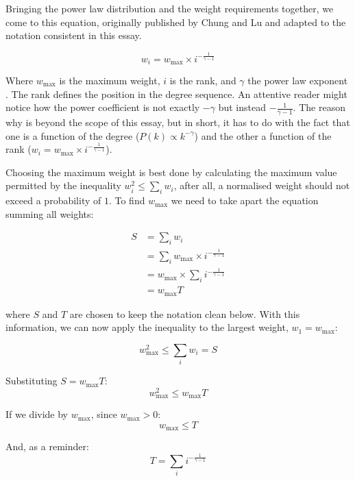 \documentclass[12pt, a4paper]{article}   %
\begin{document}
Bringing the power law distribution and the weight requirements together, we come to this equation, originally published by Chung and Lu and adapted to the notation consistent in this essay. 

\begin{equation} \label{eq:weight-generation-equation}
    w_i = w_{\text{max}} \times i^{ -\frac{1}{\gamma-1}}
\end{equation}

Where \( w_{\text{max}} \) is the maximum weight, \( i \) is the rank, and \( \gamma \) the power law exponent \autocite{chungAverageDistancesRandom2002}. The rank defines the position in the degree sequence. An attentive reader might notice how the power coefficient is not exactly \(-\gamma\) but instead \(-\frac{1}{\gamma-1}\). The reason why is beyond the scope of this essay, but in short, it has to do with the fact that one is a function of the degree (\(P(k) \propto k^{-\gamma}\)) and the other a function of the rank (\( w_i = w_{\text{max}} \times i^{ -\frac{1}{\gamma-1}}\)).

Choosing the maximum weight is best done by calculating the maximum value permitted by the inequality \( w_i^2 \leq \sum_{i}{w_i}\), after all, a normalised weight should not exceed a probability of \( 1 \). To find \( w_{\text{max}} \) we need to take apart the equation summing all weights:

\begin{equation} \label{eq:S-and-T-definition}
\begin{aligned}
S &= \sum_{i}{w_i} \\
  &= \sum_{i}{w_{\text{max}} \times i^{ -\frac{1}{\gamma-1}}} \\
  &= w_{\text{max}} \times \sum_{i}{i^{ -\frac{1}{\gamma-1}}} \\
  &= w_{\text{max}}T
\end{aligned}
\end{equation}

where \( S \) and \( T \) are chosen to keep the notation clean below. With this information, we can now apply the inequality to the largest weight, \( w_1 = w_{\text{max}} \):

\[
w_{\text{max}}^2 \leq \sum_{i}{w_i} = S
\]

Substituting \( S = w_{\text{max}}T \):
\[
w_{\text{max}}^2 \leq w_{\text{max}}T
\]

If we divide by \(w_{\text{max}}\), since \(w_{\text{max}} > 0\):
\[
w_{\text{max}} \leq T
\]

And, as a reminder:
\[
T = \sum_{i}{i^{ -\frac{1}{\gamma-1}}}
\]   
\end{document}
